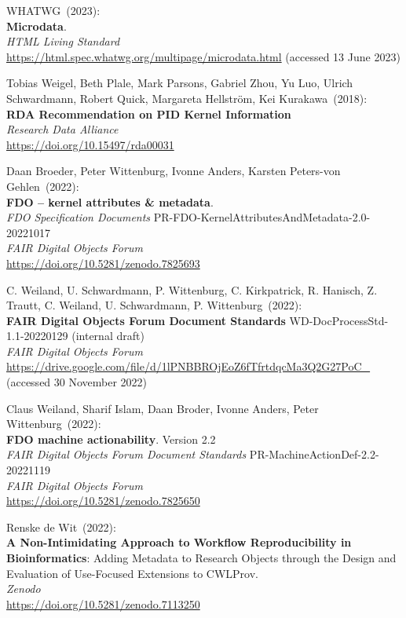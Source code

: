 \begin{thebibliography}{9}
WHATWG~(2023): \\
\textbf{Microdata}. \\
\emph{{HTML Living Standard}}\\
\url{https://html.spec.whatwg.org/multipage/microdata.html} (accessed 13
June 2023)

Tobias Weigel, Beth Plale, Mark Parsons, Gabriel Zhou, Yu Luo, Ulrich Schwardmann, Robert Quick, Margareta Hellström, Kei Kurakawa~(2018): \\
\textbf{{RDA Recommendation} on {PID Kernel Information}} \\
\emph{Research Data Alliance}\\
\url{https://doi.org/10.15497/rda00031}

Daan Broeder, Peter Wittenburg, Ivonne Anders, Karsten Peters-von Gehlen~(2022): \\
\textbf{FDO -- kernel attributes \& metadata}.\\ 
\emph{FDO Specification Documents} PR-FDO-KernelAttributesAndMetadata-2.0-20221017 \\
\emph{FAIR Digital Objects Forum}\\
\url{https://doi.org/10.5281/zenodo.7825693}

C. Weiland, U. Schwardmann, P. Wittenburg, C. Kirkpatrick, R. Hanisch, Z. Trautt, C. Weiland, U. Schwardmann, P. Wittenburg~(2022): \\
\textbf{{FAIR Digital Objects Forum Document Standards}} WD-DocProcessStd-1.1-20220129 (internal draft) \\
\emph{FAIR Digital Objects Forum}\\
\url{https://drive.google.com/file/d/1lPNBBROjEoZ6fTfrtdqcMa3Q2G27PoC_}
(accessed 30 November 2022)

Claus Weiland, Sharif Islam, Daan Broder, Ivonne Anders, Peter Wittenburg~(2022): \\
\textbf{{FDO} machine actionability}. Version 2.2 \\
\emph{{FAIR Digital Objects Forum Document Standards}} PR-MachineActionDef-2.2-20221119 \\
\emph{FAIR Digital Objects Forum} \\
\url{https://doi.org/10.5281/zenodo.7825650}

Renske de Wit~(2022): \\
\textbf{A Non-Intimidating Approach to Workflow Reproducibility in Bioinformatics}: Adding Metadata to Research Objects through the Design and Evaluation of Use-Focused Extensions to CWLProv.\\
\emph{Zenodo}\\
\url{https://doi.org/10.5281/zenodo.7113250}


\end{thebibliography}
